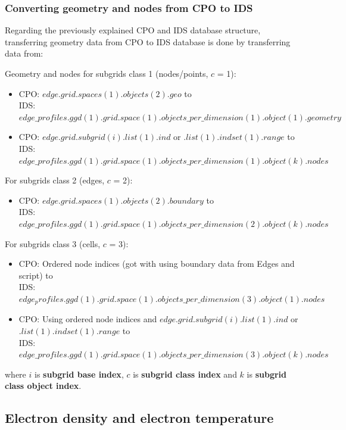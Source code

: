 \documentclass[a4paper,12pt,twoside]{article}
\begin{document}
\subsubsection{Converting geometry and nodes from CPO to IDS}

Regarding the previously explained CPO and IDS database structure, transferring geometry data from CPO to IDS database is done by transferring data from:

Geometry and nodes for subgrids class 1 (nodes/points, $c$ = 1):
\begin{itemize}
\item CPO: $edge.grid.spaces(1).objects(2).geo$ to \\
IDS: $edge\_profiles.ggd(1).grid.space(1).objects\_per\_dimension(1).object(1).geometry$
\item CPO: $edge.grid.subgrid(i).list(1).ind$ or $.list(1).indset(1).range$ to \\
IDS: $edge\_profiles.ggd(1).grid.space(1).objects\_per\_dimension(1).object(k).nodes$
\end{itemize}

For subgrids class 2 (edges, $c$ = 2):
\begin{itemize}
\item CPO: $edge.grid.spaces(1).objects(2).boundary$ to \\
IDS: $edge\_profiles.ggd(1).grid.space(1).objects\_per\_dimension(2).object(k).nodes$
\end{itemize}

For subgrids class 3 (cells, $c$ = 3):
\begin{itemize}
\item CPO: Ordered node indices (got with using boundary data from Edges and script) to \\
IDS: $edge_profiles.ggd(1).grid.space(1).objects\_per\_dimension(3).object(1).nodes$
\item CPO: Using ordered node indices and $edge.grid.subgrid(i).list(1).ind$ or $.list(1).indset(1).range$ to \\
IDS: $edge\_profiles.ggd(1).grid.space(1).objects\_per\_dimension(3).object(k).nodes$
\end{itemize}

where $i$ is \textbf{subgrid base index}, $c$ is \textbf{subgrid class index} and $k$ is \textbf{subgrid class object index}.


\clearpage


\subsection{\textbf{Electron density and electron temperature }}
\end{document}
